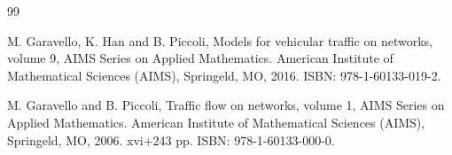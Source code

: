 \documentclass[a4paper, 10pt, final]{article}
\begin{document}
\begin{thebibliography}{99}

 
 
 M.  Garavello, K. Han   and  B.  Piccoli,
 \textsf{Models for   vehicular traffic on networks}, volume 9, 
 AIMS Series on Applied Mathematics. American Institute of Mathematical Sciences (AIMS),
Springeld, MO, 2016. ISBN: 978-1-60133-019-2.


%
%
%
 
  M.  Garavello  and  B.  Piccoli,  \textsf{Traffic flow on networks}, volume 1, 
 AIMS Series on Applied Mathematics. American Institute of Mathematical Sciences (AIMS),
Springeld, MO, 2006. xvi+243 pp. ISBN: 978-1-60133-000-0.
 
%  
%  
%
%
%
%
%  
%  
 

\end{thebibliography}
\end{document}
